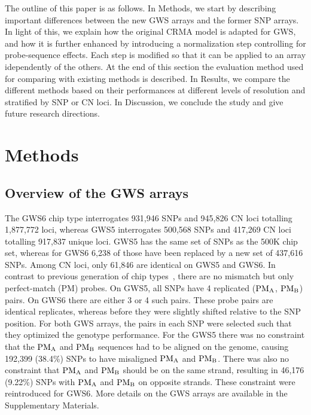 \documentclass{bioinfo}
\newcommand{\GWS}{GWS\xspace}
\newcommand{\GWSFive}{GWS5\xspace}
\newcommand{\GWSSix}{GWS6\xspace}
\newcommand{\PMA}{\ensuremath{\textnormal{PM}_\textnormal{A}}\xspace}
\newcommand{\PMB}{\ensuremath{\textnormal{PM}_\textnormal{B}}\xspace}
\begin{document}
The outline of this paper is as follows. 
In Methods, we start by describing important differences between the new \GWS arrays and the former SNP arrays.  
In light of this, we explain how the original CRMA model is adapted for \GWS, and how it is further enhanced by introducing a normalization step controlling for probe-sequence effects.  
Each step is modified so that it can be applied to an array idependently of the others.
At the end of this section the evaluation method used for comparing with existing methods is described.
In Results, we compare the different methods based on their performances at different levels of resolution and stratified by SNP or CN loci.
In Discussion, we conclude the study and give future research directions.



\section{Methods}
\subsection{Overview of the \GWS arrays}

The \GWSSix chip type interrogates 931,946 SNPs and 945,826 CN loci totalling 1,877,772 loci, whereas \GWSFive interrogates 500,568 SNPs and 417,269 CN loci totalling 917,837 unique loci.  \GWSFive has the same set of SNPs as the 500K chip set, whereas for \GWSSix 6,238 of those have been replaced by a new set of 437,616 SNPs.  Among CN loci, only 61,846 are identical on \GWSFive and \GWSSix.
%
In contrast to previous generation of chip types~\citep{BengtssonH_etal_2008a}, there are no  mismatch but only perfect-match (PM) probes.  
On \GWSFive, all SNPs have 4 replicated (\PMA, \PMB) pairs.  On \GWSSix there are either 3 or 4 such pairs. These probe pairs are identical replicates, whereas before they were slightly shifted relative to the SNP position.
%
For both \GWS arrays, the pairs in each SNP were selected such that they optimized the genotype performance.  For the \GWSFive there was no constraint that the \PMA and \PMB sequences had to be aligned on the genome, causing 192,399 (38.4\%) SNPs to have misaligned \PMA and \PMB.  There was also no constraint that \PMA and \PMB should be on the same strand, resulting in 46,176 (9.22\%) SNPs with \PMA and \PMB on opposite strands.  These constraint were reintroduced for \GWSSix.
More details on the \GWS arrays are available in the Supplementary Materials.
\end{document}
